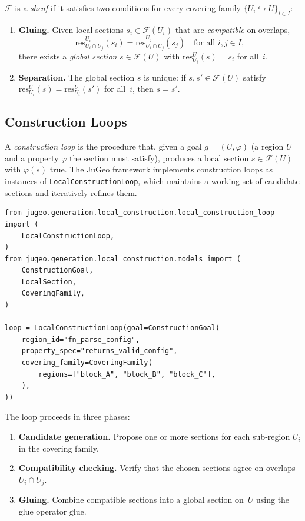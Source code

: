 \documentclass[11pt]{article}
\newcommand{\sheaf}{\mathcal{F}}
\newcommand{\restrict}{\mathrm{res}}
\newcommand{\glueop}{\mathrm{glue}}
\begin{document}
$\sheaf$ is a \emph{sheaf} if it satisfies two conditions for every
covering family $\{U_i \hookrightarrow U\}_{i \in I}$:

\begin{enumerate}
  \item \textbf{Gluing.}  Given local sections $s_i \in \sheaf(U_i)$
        that are \emph{compatible} on overlaps,
        \[
          \restrict^{U_i}_{U_i \cap U_j}(s_i)
          = \restrict^{U_j}_{U_i \cap U_j}(s_j)
          \quad\text{for all } i,j \in I,
        \]
        there exists a \emph{global section} $s \in \sheaf(U)$ with
        $\restrict^U_{U_i}(s) = s_i$ for all~$i$.
  \item \textbf{Separation.}  The global section $s$ is unique: if
        $s, s' \in \sheaf(U)$ satisfy
        $\restrict^U_{U_i}(s) = \restrict^U_{U_i}(s')$ for all~$i$,
        then $s = s'$.
\end{enumerate}

\subsection{Construction Loops}\label{sec:bg-loops}

A \emph{construction loop} is the procedure that, given a goal
$g = (U, \varphi)$ (a region $U$ and a property $\varphi$ the section
must satisfy), produces a local section $s \in \sheaf(U)$ with
$\varphi(s)$ true.  The JuGeo framework implements construction loops
as instances of \texttt{LocalConstructionLoop}, which maintains a
working set of candidate sections and iteratively refines them.

\begin{lstlisting}
from jugeo.generation.local_construction.local_construction_loop import (
    LocalConstructionLoop,
)
from jugeo.generation.local_construction.models import (
    ConstructionGoal,
    LocalSection,
    CoveringFamily,
)

loop = LocalConstructionLoop(goal=ConstructionGoal(
    region_id="fn_parse_config",
    property_spec="returns_valid_config",
    covering_family=CoveringFamily(
        regions=["block_A", "block_B", "block_C"],
    ),
))
\end{lstlisting}

The loop proceeds in three phases:
\begin{enumerate}
  \item \textbf{Candidate generation.}  Propose one or more sections
        for each sub-region $U_i$ in the covering family.
  \item \textbf{Compatibility checking.}  Verify that the chosen
        sections agree on overlaps $U_i \cap U_j$.
  \item \textbf{Gluing.}  Combine compatible sections into a global
        section on~$U$ using the glue operator $\glueop$.
\end{enumerate}
\end{document}

